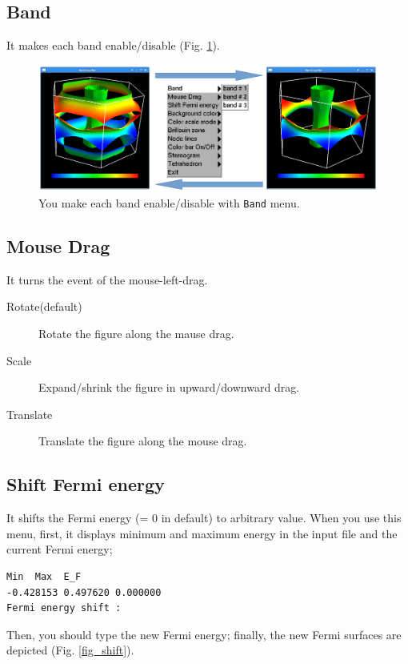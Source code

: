 \documentclass[12pt]{article}
\begin{document}
\subsection{Band}

It makes each band enable/disable (Fig. \ref{fig_band}).

\begin{figure}[!ht]
  \includegraphics[width=17cm]{figs/band.eps}
  \caption{You make each band enable/disable with \texttt{Band} menu.}
  \label{fig_band}
\end{figure}

\subsection{Mouse Drag}

It turns the event of the mouse-left-drag.

\begin{description}
\item[Rotate(default)] Rotate the figure along the mause drag.
\item[Scale] Expand/shrink the figure in upward/downward drag.
\item[Translate] Translate the figure along the mouse drag.
\end{description}

\subsection{Shift Fermi energy}

It shifts the Fermi energy (= 0 in default) to arbitrary value.
When you use this menu, 
first, it displays minimum and maximum energy in the input file
and the current Fermi energy;
\begin{verbatim}
Min  Max  E_F 
-0.428153 0.497620 0.000000 
Fermi energy shift : 
\end{verbatim}
Then, you should type the new Fermi energy;
finally, the new Fermi surfaces are depicted (Fig. \ref{fig_shift}).
\end{document}
